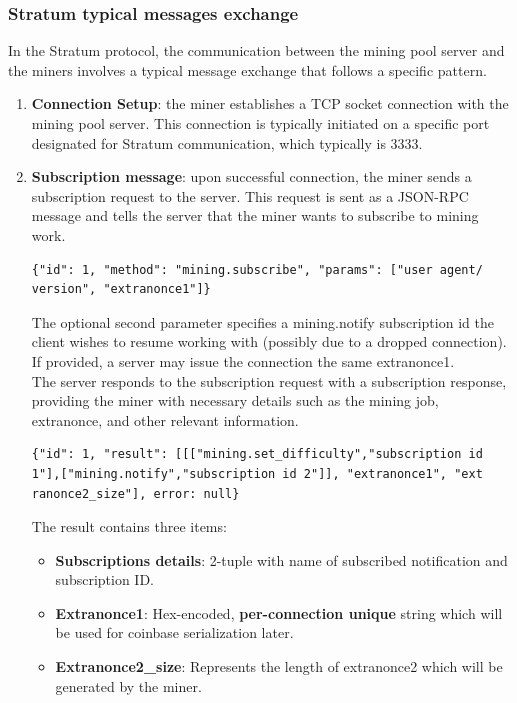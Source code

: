 \subsubsection{Stratum typical messages exchange \cite{bitcoinStratumMining}}\label{sssec:sv1_messages} 
In the Stratum protocol, the communication between the mining pool server and the miners involves a typical message exchange that follows a specific pattern.
\begin{enumerate}
    \item \textbf{Connection Setup}: the miner establishes a TCP socket connection with the mining pool server. This connection is typically initiated on a specific port designated for Stratum communication, which typically is 3333.
    \item \textbf{Subscription message}: upon successful connection, the miner sends a subscription request to the server. This request is sent as a JSON-RPC message and tells the server that the miner wants to subscribe to mining work.
    \begin{verbatim}
{"id": 1, "method": "mining.subscribe", "params": ["user agent/
version", "extranonce1"]}
    \end{verbatim}
    The optional second parameter specifies a mining.notify subscription id the client wishes to resume working with (possibly due to a dropped connection). If provided, a server may issue the connection the same extranonce1.\\
    The server responds to the subscription request with a subscription response, providing the miner with necessary details such as the mining job, extranonce, and other relevant information.
    \begin{verbatim}
{"id": 1, "result": [[["mining.set_difficulty","subscription id
1"],["mining.notify","subscription id 2"]], "extranonce1", "ext
ranonce2_size"], error: null}
    \end{verbatim}
    The result contains three items:
    \begin{itemize}
        \item \textbf{Subscriptions details}: 2-tuple with name of subscribed notification and subscription ID. 
        \item \textbf{Extranonce1}: Hex-encoded, \textbf{per-connection unique} string which will be used for coinbase serialization later.
        \item \textbf{Extranonce2\_size}: Represents the length of extranonce2 which will be generated by the miner.
    \end{itemize}

\end{enumerate}
